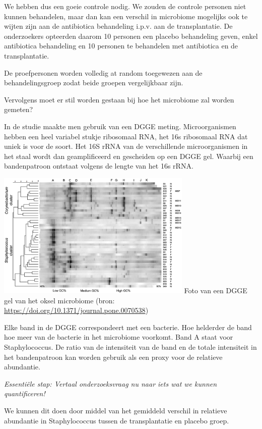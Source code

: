 \documentclass[
  12pt,dutch,coursenotes]{book}
\theoremstyle{definition}
\theoremstyle{definition}
\theoremstyle{definition}
\theoremstyle{definition}
\theoremstyle{remark}
\begin{document}
We hebben dus een goeie controle nodig.
We zouden de controle personen niet kunnen behandelen, maar dan kan een verschil in microbiome mogelijks ook te wijten zijn aan de antibiotica behandeling i.p.v. aan de transplantatie.
De onderzoekers opteerden daarom 10 personen een placebo behandeling geven, enkel antibiotica behandeling en 10 personen te behandelen met antibiotica en de transplantatie.

De proefpersonen worden volledig at random toegewezen aan de behandelingsgroep zodat beide groepen vergelijkbaar zijn.

Vervolgens moet er stil worden gestaan bij hoe het microbiome zal worden gemeten?

In de studie maakte men gebruik van een DGGE meting.
Microorganismen hebben een heel variabel stukje ribosomaal RNA, het 16s ribosomaal RNA dat uniek is voor de soort.
Het 16S rRNA van de verschillende microorganismen in het staal wordt dan geamplificeerd en gescheiden op een DGGE gel.
Waarbij een bandenpatroon ontstaat volgens de lengte van het 16s rRNA.

\includegraphics[width=0.7\textwidth,height=\textheight]{./figures/dgge.png}
Foto van een DGGE gel van het oksel microbiome (bron: \url{https://doi.org/10.1371/journal.pone.0070538})

Elke band in de DGGE correspondeert met een bacterie.
Hoe helderder de band hoe meer van de bacterie in het microbiome voorkomt.
Band A staat voor Staphylococcus.
De ratio van de intensiteit van de band en de totale intensiteit in het bandenpatroon kan worden gebruik als een proxy voor de relatieve abundantie.

\emph{Essentiële stap: Vertaal onderzoeksvraag nu naar iets wat we kunnen quantificeren!}

We kunnen dit doen door middel van het gemiddeld verschil in relatieve abundantie in Staphylococcus tussen de transplantatie en placebo groep.
\end{document}

